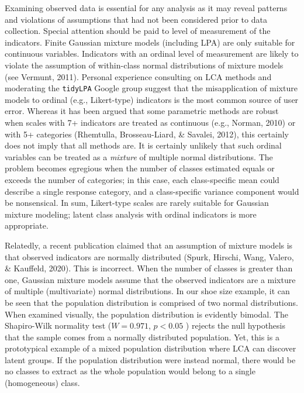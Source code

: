 \documentclass[
  ,man,floatsintext]{apa6}
\begin{document}
Examining observed data is essential for any analysis as it may reveal
patterns and violations of assumptions that had not been considered
prior to data collection. Special attention should be paid to level of
measurement of the indicators. Finite Gaussian mixture models (including
LPA) are only suitable for continuous variables. Indicators with an
ordinal level of measurement are likely to violate the assumption of
within-class normal distributions of mixture models (see Vermunt, 2011). Personal experience consulting on LCA methods
and moderating the \texttt{tidyLPA} Google group suggest that the
misapplication of mixture models to ordinal (e.g., Likert-type)
indicators is the most common source of user error. Whereas it has been
argued that some parametric methods are robust when scales with 7+
indicators are treated as continuous (e.g., Norman, 2010) or
with 5+ categories (Rhemtulla, Brosseau-Liard, \& Savalei, 2012), this
certainly does not imply that all methods are. It is certainly unlikely
that such ordinal variables can be treated as a \emph{mixture} of multiple
normal distributions. The problem becomes egregious when the number of
classes estimated equals or exceeds the number of categories; in this
case, each class-specific mean could describe a single response
category, and a class-specific variance component would be nonsensical.
In sum, Likert-type scales are rarely suitable for Gaussian mixture modeling;
latent class analysis with ordinal indicators is more appropriate.

Relatedly, a recent publication claimed that an assumption of mixture
models is that observed indicators are normally distributed
(Spurk, Hirschi, Wang, Valero, \& Kauffeld, 2020). This is incorrect. When the number of classes is
greater than one, Gaussian mixture models assume that the observed indicators are
a mixture of multiple (multivariate) normal distributions. In our shoe
size example, it can be seen that the population distribution is
comprised of two normal distributions. When examined visually, the
population distribution is evidently bimodal. The Shapiro-Wilk normality
test (\(W = 0.971\), \(p < 0.05\) ) rejects the null hypothesis that the
sample comes from a normally distributed population. Yet, this is a
prototypical example of a mixed population distribution where LCA can
discover latent groups. If the population distribution were instead
normal, there would be no classes to extract as the whole population
would belong to a single (homogeneous) class.
\end{document}
